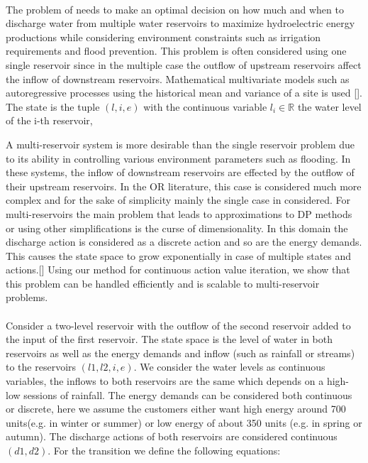 \documentclass[letterpaper]{article}
\renewcommand{\-}{\text{-}}
\begin{document}
\paragraph{\WaterReservoir}The problem of \WaterReservoir needs to make an optimal decision on how much and when to discharge water from multiple water reservoirs to maximize hydroelectric energy productions while considering environment constraints such as irrigation requirements and flood prevention. This problem is often considered using 
one single reservoir since in the multiple case the outflow of upstream reservoirs affect the inflow of downstream reservoirs. Mathematical multivariate models such as autoregressive  processes using the historical mean and variance of a site is used []. 
The state is the tuple $(l,i,e)$ with the continuous variable $l_i \in\mathbb{R}$ the water level of the i-th reservoir,

A multi-reservoir system is more desirable than the single reservoir problem due to its ability in controlling various environment parameters such as flooding. 
In these systems, the inflow of downstream reservoirs are effected by the outflow of their upstream reservoirs. In the OR literature, this case 
is considered much more complex and for the sake of simplicity mainly the single case in considered. For multi-reservoirs the main problem that leads to 
approximations to DP methods or using other simplifications is the curse of dimensionality. In this domain the discharge action is considered as a discrete action 
and so are the energy demands. This causes the state space to grow exponentially in case of multiple states and actions.[]
Using our method for continuous action value iteration, we show that this problem can be handled efficiently and is scalable to multi-reservoir problems. 

\paragraph{\MultiWaterReservoir} Consider a two-level reservoir with the outflow of the second reservoir added to the input of the first reservoir. The state space is the level of water in both reservoirs as well as the energy demands and inflow (such as rainfall or streams) to the reservoirs $(l1,l2,i,e)$. We consider the water levels as continuous variables, the inflows to both reservoirs are the same which depends on a high-low sessions of rainfall. The energy demands can be considered both continuous or discrete, here we assume the customers either want high energy around 700 units(e.g. in winter or summer) or low energy of about 350 units (e.g. in spring or autumn). 
The discharge actions of both reservoirs are considered continuous $(d1,d2)$. For the transition we define the following equations: 
\end{document}
